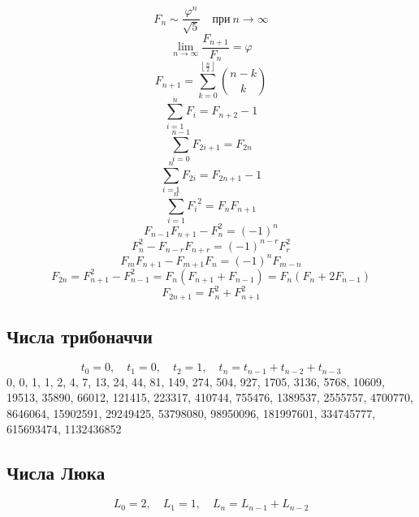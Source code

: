 \documentclass[11.5pt,a4paper,landscape,oneside]{amsart}
\newcommand{\Sequence}[1]{\subsection{#1}}
\begin{document}
\begin{multicols*}{2}
	\begin{equation}
		F_n\sim\frac{\varphi^n}{\sqrt{5}}\quad\text{при}\ n\to\infty
	\end{equation}
	\begin{equation}
		\lim_{n\to\infty}\frac{F_{n+1}}{F_n}=\varphi
	\end{equation}
	\begin{equation}
		F_{n+1}=\sum_{k=0}^{\left\lfloor\frac{n}{2}\right\rfloor} \binom{n-k}{k}
	\end{equation}
	\begin{equation}
		\sum_{i=1}^n F_i = F_{n+2} - 1
	\end{equation}
	\begin{equation}
		\sum_{i=0}^{n-1} F_{2i+1} = F_{2n}
	\end{equation}
	\begin{equation}
		\sum_{i=1}^{n} F_{2i} = F_{2n+1}-1
	\end{equation}
	\begin{equation}
		\sum_{i=1}^n {F_i}^2 = F_{n} F_{n+1}
	\end{equation}
	\begin{equation}
		F_{n-1}F_{n+1} - F_n^2 = (-1)^n
	\end{equation}
	\begin{equation}
		F_n^2 - F_{n-r}F_{n+r} = (-1)^{n-r}F_r^2
	\end{equation}
	\begin{equation}
		F_m F_{n+1} - F_{m+1} F_n = (-1)^n F_{m-n}
	\end{equation}
	\begin{equation}
		F_{2n} = F_{n+1}^2 - F_{n-1}^2 = F_n \left(F_{n+1}+F_{n-1}\right) = F_n \left(F_{n}+2F_{n-1}\right)
	\end{equation}
	\begin{equation}
		F_{2n+1} = F_{n}^2 + F_{n+1}^2
	\end{equation}
	\Sequence{Числа трибоначчи}
	\begin{equation}
		t_0=0,\quad t_1=0,\quad t_2=1,\quad t_{n}=t_{n-1}+t_{n-2}+t_{n-3}
	\end{equation}
	0, 0, 1, 1, 2, 4, 7, 13, 24, 44, 81, 149, 274, 504, 927, 1705, 3136, 5768, 10609, 19513, 35890, 66012, 121415, 223317, 410744, 755476, 1389537, 2555757, 4700770, 8646064, 15902591, 29249425, 53798080, 98950096, 181997601, 334745777, 615693474, 1132436852
	\Sequence{Числа Люка}
	\begin{equation}
		L_0=2,\quad L_1=1,\quad L_{n}=L_{n-1}+L_{n-2}
	\end{equation}

\end{multicols*}
\end{document}
